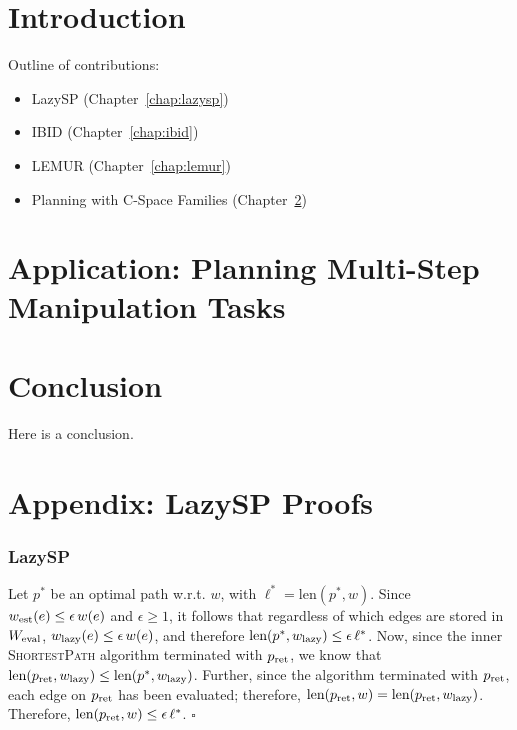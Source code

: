 \documentclass[nobib]{tufte-book}
\newcommand{\ms}[1]{\mbox{\scriptsize #1}}
\newenvironment{proof}[1][Proof]{\begin{trivlist}
   \item[\hskip \labelsep {\bfseries #1}]}{\hfill$\square$\end{trivlist}}
\begin{document}

\tableofcontents

\chapter{Introduction}

Outline of contributions:
\begin{itemize}
\item LazySP (Chapter~\ref{chap:lazysp})
\item IBID (Chapter~\ref{chap:ibid})
\item LEMUR (Chapter~\ref{chap:lemur})
\item Planning with C-Space Families (Chapter~\ref{chap:family})
\end{itemize}

%

%



\chapter{Application: Planning Multi-Step Manipulation Tasks}
\label{chap:family}


\chapter{Conclusion}

Here is a conclusion.


\appendix

\chapter{Appendix: LazySP Proofs}
\label{sec:appendix-proofs}

\subsection{LazySP}

\begin{proof}[Proof of Theorem \ref{thm:lazy-optimality}]
Let $p^*$ be an optimal path w.r.t. $w$,
with $\ell^* = \mbox{len}(p^*, w)$.
Since $w_{\ms{est}}(e) \leq \epsilon \, w(e)$ and $\epsilon \geq 1$,
it follows that regardless of which edges are stored in $W_{\ms{eval}}$,
$w_{\ms{lazy}}(e) \leq \epsilon \, w(e)$,
and therefore
$\mbox{len}(p^*, w_{\ms{lazy}}) \leq \epsilon \, \ell^*$.
Now,
since the inner \textsc{ShortestPath} algorithm terminated with
$p_{\ms{ret}}$,
we know that
$\mbox{len}(p_{\ms{ret}}, w_{\ms{lazy}}) \leq \mbox{len}(p^*, w_{\ms{lazy}})$.
Further,
since the algorithm terminated with $p_{\ms{ret}}$,
each edge on $p_{\ms{ret}}$ has been evaluated;
therefore,
$\mbox{len}(p_{\ms{ret}}, w) = \mbox{len}(p_{\ms{ret}}, w_{\ms{lazy}})$.
Therefore,
$\mbox{len}(p_{\ms{ret}}, w) \leq \epsilon \, \ell^*$.
\end{proof}
\end{document}

